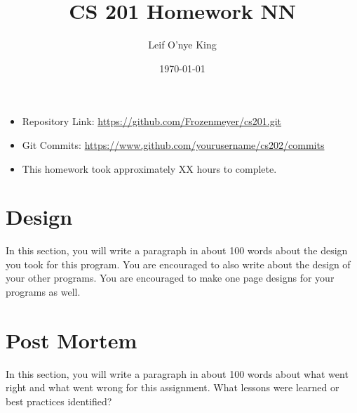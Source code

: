 \documentclass[12pt]{article}
\title{\bfseries CS 201 Homework NN}
\author{Leif O'nye King}
\date{\today}
\begin{document}
\maketitle


\begin{itemize}
\item Repository Link:
\url{https://github.com/Frozenmeyer/cs201.git}

\item Git Commits:
\url{https://www.github.com/yourusername/cs202/commits}


\item This homework took approximately XX hours to complete.
\end{itemize}





\section{Design}

In this section, you will write a paragraph in about 100 words about the design you took for this program. You are encouraged to also write about the design of your other programs. You are encouraged to make one page designs for your programs as well.





\section{Post Mortem}

In this section, you will write a paragraph in about 100 words about what went right and what went wrong for this assignment. What lessons were learned or best practices identified?
\end{document}
